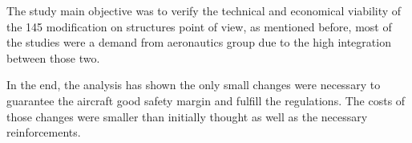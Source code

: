 
The study main objective was to verify the technical and economical viability of the 145 modification on structures point of view, as mentioned before, most of the studies were a demand from aeronautics group due to the high integration between those two.

In the end, the analysis has shown the only small changes were necessary to guarantee the aircraft good safety margin and fulfill the regulations. The costs of those changes were smaller than initially thought as well as the necessary reinforcements.